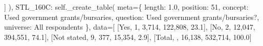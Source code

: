 \documentclass[
  11pt,
  a4paper,
]{article}
\newenvironment{Shaded}{\begin{snugshade}}{\end{snugshade}}
\newcommand{\NormalTok}[1]{\textcolor[rgb]{0.00,0.23,0.31}{#1}}
\newcommand{\OperatorTok}[1]{\textcolor[rgb]{0.37,0.37,0.37}{#1}}
\newcommand{\StringTok}[1]{\textcolor[rgb]{0.13,0.47,0.30}{#1}}
\newcommand{\VariableTok}[1]{\textcolor[rgb]{0.07,0.07,0.07}{#1}}
\begin{document}
\begin{Shaded}
\begin{Highlighting}[]
\NormalTok{                ]}
\NormalTok{            ),}
            \StringTok{\textquotesingle{}STL\_160C\textquotesingle{}}\NormalTok{: }\VariableTok{self}\NormalTok{.\_create\_table(}
\NormalTok{                meta}\OperatorTok{=}\NormalTok{\{}
                    \StringTok{\textquotesingle{}length\textquotesingle{}}\NormalTok{: }\StringTok{\textquotesingle{}1.0\textquotesingle{}}\NormalTok{, }\StringTok{\textquotesingle{}position\textquotesingle{}}\NormalTok{: }\StringTok{\textquotesingle{}51\textquotesingle{}}\NormalTok{,}
                    \StringTok{\textquotesingle{}concept\textquotesingle{}}\NormalTok{: }\StringTok{\textquotesingle{}Used government grants/bursaries\textquotesingle{}}\NormalTok{,}
                    \StringTok{\textquotesingle{}question\textquotesingle{}}\NormalTok{: }\StringTok{\textquotesingle{}Used government grants/bursaries?\textquotesingle{}}\NormalTok{,}
                    \StringTok{\textquotesingle{}universe\textquotesingle{}}\NormalTok{: }\StringTok{\textquotesingle{}All respondents\textquotesingle{}}
\NormalTok{                \},}
\NormalTok{                data}\OperatorTok{=}\NormalTok{[}
\NormalTok{                    [}\StringTok{\textquotesingle{}Yes\textquotesingle{}}\NormalTok{, }\StringTok{\textquotesingle{}1\textquotesingle{}}\NormalTok{, }\StringTok{\textquotesingle{}3,714\textquotesingle{}}\NormalTok{, }\StringTok{\textquotesingle{}122,808\textquotesingle{}}\NormalTok{, }\StringTok{\textquotesingle{}23.1\textquotesingle{}}\NormalTok{],}
\NormalTok{                    [}\StringTok{\textquotesingle{}No\textquotesingle{}}\NormalTok{, }\StringTok{\textquotesingle{}2\textquotesingle{}}\NormalTok{, }\StringTok{\textquotesingle{}12,047\textquotesingle{}}\NormalTok{, }\StringTok{\textquotesingle{}394,551\textquotesingle{}}\NormalTok{, }\StringTok{\textquotesingle{}74.1\textquotesingle{}}\NormalTok{],}
\NormalTok{                    [}\StringTok{\textquotesingle{}Not stated\textquotesingle{}}\NormalTok{, }\StringTok{\textquotesingle{}9\textquotesingle{}}\NormalTok{, }\StringTok{\textquotesingle{}377\textquotesingle{}}\NormalTok{, }\StringTok{\textquotesingle{}15,354\textquotesingle{}}\NormalTok{, }\StringTok{\textquotesingle{}2.9\textquotesingle{}}\NormalTok{],}
\NormalTok{                    [}\StringTok{\textquotesingle{}Total\textquotesingle{}}\NormalTok{, }\StringTok{\textquotesingle{}\textquotesingle{}}\NormalTok{, }\StringTok{\textquotesingle{}16,138\textquotesingle{}}\NormalTok{, }\StringTok{\textquotesingle{}532,714\textquotesingle{}}\NormalTok{, }\StringTok{\textquotesingle{}100.0\textquotesingle{}}\NormalTok{]}

\end{Highlighting}
\end{Shaded}
\end{document}
